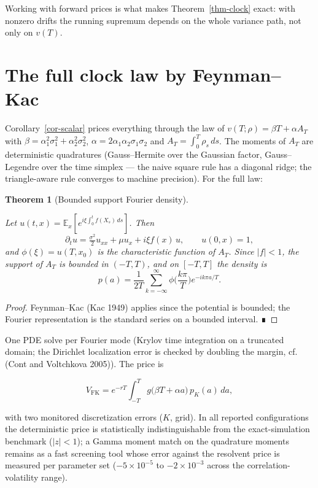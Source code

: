 \documentclass[
  english,
  10pt,
  letterpaper,
  DIV=11,
  numbers=noendperiod]{scrartcl}
\theoremstyle{plain}
\newtheorem{theorem}{Theorem}[section]
\theoremstyle{plain}
\theoremstyle{plain}
\theoremstyle{plain}
\theoremstyle{definition}
\theoremstyle{remark}
\begin{document}
Working with forward prices is what makes Theorem~\ref{thm-clock} exact:
with nonzero drifts the running supremum depends on the whole variance
path, not only on \(v(T)\).

\section{The full clock law by Feynman--Kac}\label{sec-fk}

Corollary~\ref{cor-scalar} prices everything through the law of
\(v(T;\rho)=\beta T+\alpha A_T\) with
\(\beta=\alpha_1^{2}\sigma_1^{2}+\alpha_2^{2}\sigma_2^{2}\),
\(\alpha=2\alpha_1\alpha_2\sigma_1\sigma_2\) and
\(A_T=\int_0^T\rho_s\,ds\). The moments of \(A_T\) are deterministic
quadratures (Gauss--Hermite over the Gaussian factor, Gauss--Legendre
over the time simplex --- the naive square rule has a diagonal ridge;
the triangle-aware rule converges to machine precision). For the full
law:

\begin{theorem}[Bounded support Fourier
density]\protect\hypertarget{thm-fk}{}\label{thm-fk}

Let \(u(t,x)=\mathbb E_x[e^{i\xi\int_0^t f(X_s)\,ds}]\). Then \[
\partial_t u=\tfrac{\sigma^{2}}{2}u_{xx}+\mu u_x+i\xi f(x)\,u,\qquad
u(0,x)=1,
\] and \(\phi(\xi)=u(T,x_0)\) is the characteristic function of \(A_T\).
Since \(|f|<1\), the support of \(A_T\) is bounded in \((-T,T)\), and on
\([-T,T]\) the density is \[
p(a)=\frac{1}{2T}\sum_{k=-\infty}^{\infty}
\phi\!\Big(\frac{k\pi}{T}\Big)e^{-ik\pi a/T}.
\]

\end{theorem}

\begin{proof}
Feynman--Kac (Kac 1949) applies since the potential is bounded; the
Fourier representation is the standard series on a bounded interval. ∎
\end{proof}

One PDE solve per Fourier mode (Krylov time integration on a truncated
domain; the Dirichlet localization error is checked by doubling the
margin, cf. (Cont and Voltchkova 2005)). The price is

\[
V_{\mathrm{FK}}
=
e^{-rT}\int_{-T}^{T}g\big(\beta T+\alpha a\big)\,p_K(a)\,da ,
\]

with two monitored discretization errors (\(K\), grid). In all reported
configurations the deterministic price is statistically
indistinguishable from the exact-simulation benchmark (\(|z|<1\)); a
Gamma moment match on the quadrature moments remains as a fast screening
tool whose error against the resolvent price is measured per parameter
set (\(-5\times10^{-5}\) to \(-2\times10^{-3}\) across the
correlation-volatility range).
\end{document}
